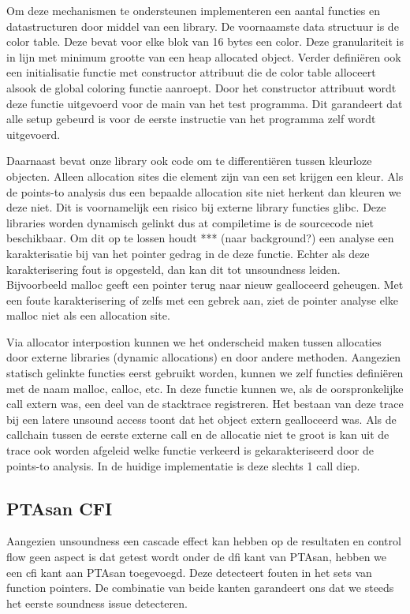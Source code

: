 \documentclass[conference]{IEEEtran}
\begin{document}
Om deze mechanismen te ondersteunen implementeren een aantal functies en datastructuren door middel van een library. De voornaamste data structuur is de color table. Deze bevat voor elke blok van 16 bytes een color. Deze granulariteit is in lijn met minimum grootte van een heap allocated object. Verder definiëren ook een initialisatie functie met constructor attribuut die de color table alloceert alsook de global coloring functie aanroept. Door het constructor attribuut wordt deze functie uitgevoerd voor de main van het test programma. Dit garandeert dat alle setup gebeurd is voor de eerste instructie van het programma zelf wordt uitgevoerd.

Daarnaast bevat onze library ook code om te differentiëren tussen kleurloze objecten. Alleen allocation sites die element zijn van een set krijgen een kleur. Als de points-to analysis dus een bepaalde allocation site niet herkent dan kleuren we deze niet. Dit is voornamelijk een risico bij externe library functies glibc. Deze libraries worden dynamisch gelinkt dus at compiletime is de sourcecode niet beschikbaar. Om dit op te lossen houdt *** (naar background?) een analyse een karakterisatie bij van het pointer gedrag in de deze functie. Echter als deze karakterisering fout is opgesteld, dan kan dit tot unsoundness leiden. Bijvoorbeeld malloc geeft een pointer terug naar nieuw gealloceerd geheugen. Met een foute karakterisering of zelfs met een gebrek aan, ziet de pointer analyse elke malloc niet als een allocation site. 

Via allocator interpostion kunnen we het onderscheid maken tussen allocaties door externe libraries (dynamic allocations) en door andere methoden. Aangezien statisch gelinkte functies eerst gebruikt worden, kunnen we zelf functies definiëren met de naam malloc, calloc, etc. In deze functie kunnen we, als de oorspronkelijke call extern was, een deel van de stacktrace registreren. Het bestaan van deze trace bij een latere unsound access toont dat het object extern gealloceerd was. Als de callchain tussen de eerste externe call en de allocatie niet te groot is kan uit de trace ook worden afgeleid welke functie verkeerd is gekarakteriseerd door de points-to analysis. In de huidige implementatie is deze slechts 1 call diep.

\subsection{PTAsan CFI}
Aangezien unsoundness een cascade effect kan hebben op de resultaten en control flow geen aspect is dat getest wordt onder de \gls{dfi} kant van PTAsan, hebben we een \gls{cfi} kant aan PTAsan toegevoegd. Deze detecteert fouten in het sets van function pointers. De combinatie van beide kanten garandeert ons dat we steeds het eerste soundness issue detecteren.
\end{document}
